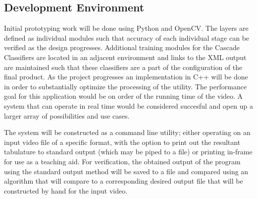 \subsection{Development Environment}
Initial prototyping work will be done using Python and OpenCV.
The layers are defined as individual modules such that accuracy of each individual stage can be verified as the design progresses.
Additional training modules for the Cascade Classifiers are located in an adjacent environment
and links to the XML output are maintained such that these classifiers are a part of the configuration of the final product.
As the project progresses an implementation in C++ will be done in order to substantially optimize the processing of the utility.
The performance goal for this application would be on order of the running time of the video.
A system that can operate in real time would be considered succesful and open up a larger array of possibilities and use cases.
\par
The system will be constructed as a command line utility;
either operating on an input video file of a specific format, with the option to
print out the resultant tabulature to standard output (which may be piped to a file)
or printing in-frame for use as a teaching aid.
For verification, the obtained output of the program using the standard output method
will be saved to a file and compared using an algorithm that will compare
to a corresponding desired output file that will be constructed by hand for the input video.

